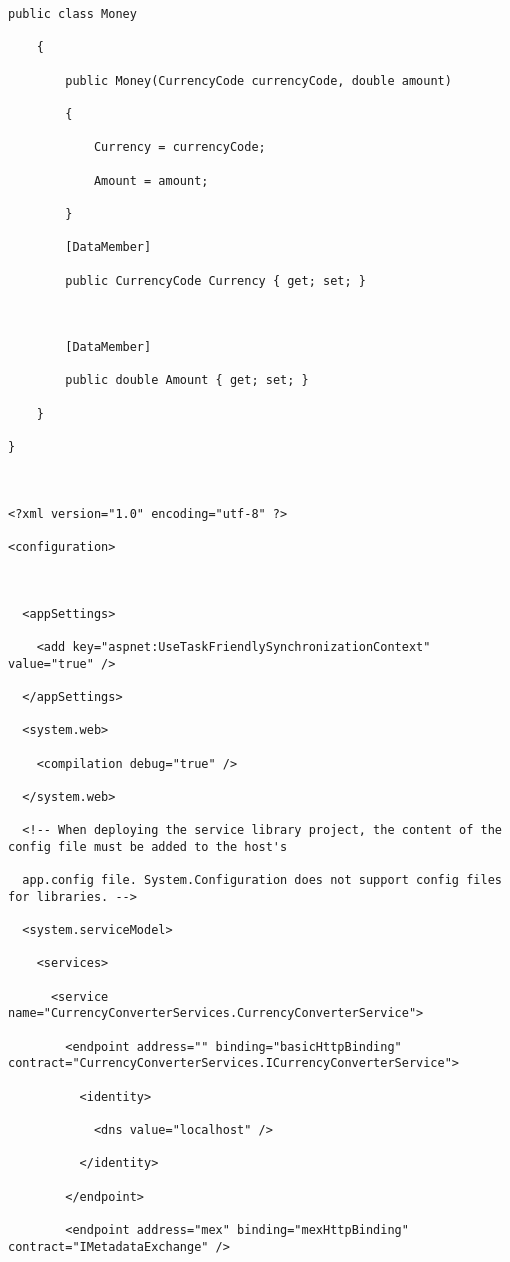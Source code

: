 \documentclass[a4paper,10pt]{scrreprt}
\begin{document}
\begin{lstlisting}[caption=wcf example]
    public class Money

    {

        public Money(CurrencyCode currencyCode, double amount)

        {

            Currency = currencyCode;

            Amount = amount;

        }

        [DataMember]

        public CurrencyCode Currency { get; set; }



        [DataMember]

        public double Amount { get; set; }

    }

}



<?xml version="1.0" encoding="utf-8" ?>

<configuration>



  <appSettings>

    <add key="aspnet:UseTaskFriendlySynchronizationContext" value="true" />

  </appSettings>

  <system.web>

    <compilation debug="true" />

  </system.web>

  <!-- When deploying the service library project, the content of the config file must be added to the host's 

  app.config file. System.Configuration does not support config files for libraries. -->

  <system.serviceModel>

    <services>

      <service name="CurrencyConverterServices.CurrencyConverterService">

        <endpoint address="" binding="basicHttpBinding" contract="CurrencyConverterServices.ICurrencyConverterService">

          <identity>

            <dns value="localhost" />

          </identity>

        </endpoint>

        <endpoint address="mex" binding="mexHttpBinding" contract="IMetadataExchange" />


\end{lstlisting}
\end{document}
